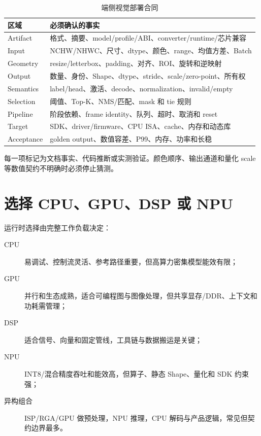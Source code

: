 \begin{table}[H]
  \centering
  \caption{端侧视觉部署合同}
  \begin{tabular}{p{23mm}p{107mm}}
    \hline
    区域 & 必须确认的事实 \\
    \hline
    Artifact & 格式、摘要、model/profile/ABI、converter/runtime/芯片兼容 \\
    Input & NCHW/NHWC、尺寸、dtype、颜色、range、均值方差、Batch \\
    Geometry & resize/letterbox、padding、对齐、ROI、旋转和逆映射 \\
    Output & 数量、身份、Shape、dtype、stride、scale/zero-point、所有权 \\
    Semantics & label/head、激活、decode、normalization、invalid/empty \\
    Selection & 阈值、Top-K、NMS/匹配、mask 和 tie 规则 \\
    Pipeline & 阶段依赖、frame identity、队列、超时、取消和 reset \\
    Target & SDK、driver/firmware、CPU ISA、cache、内存和动态库 \\
    Acceptance & golden output、数值容差、P99、内存、功率和长稳 \\
    \hline
  \end{tabular}
\end{table}

每一项标记为文档事实、代码推断或实测验证。颜色顺序、输出通道和量化 scale 等数值契约不明确时必须停止猜测。

\section{选择 CPU、GPU、DSP 或 NPU}

运行时选择由完整工作负载决定：

\begin{description}
  \item[CPU] 易调试、控制流灵活、参考路径重要，但高算力密集模型能效有限；
  \item[GPU] 并行和生态成熟，适合可编程图与图像处理，但共享显存/DDR、上下文和功耗需管理；
  \item[DSP] 适合信号、向量和固定管线，工具链与数据搬运是关键；
  \item[NPU] INT8/混合精度吞吐和能效高，但算子、静态 Shape、量化和 SDK 约束强；
  \item[异构组合] ISP/RGA/GPU 做预处理，NPU 推理，CPU 解码与产品逻辑，常见但契约边界最多。
\end{description}

